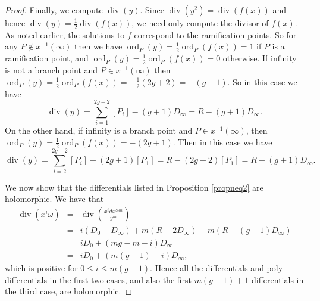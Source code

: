\documentclass[11pt]{article} %
\theoremstyle{plain}
\theoremstyle{remark}
\newcommand{\cL}{{\mathcal L}}
\DeclareMathOperator{\ord}{ord}
\DeclareMathOperator{\di}{div}
\begin{document}
\begin{proof}
Finally, we compute $\di (y)$.
Since $\di (y^2) = \di (f(x))$ and hence $\di(y) = \frac{1}{2}\di(f(x))$, we need only compute the divisor of $f(x)$.
As noted earlier, the solutions to $f$ correspond to the ramification points.
So for any $P\notin x^{-1}(\infty)$ then we have $\ord_P(y) =  \frac{1}{2}\ord_P(f(x)) = 1$ if $P$ is a ramification point, and $\ord_P(y) = \frac{1}{2}\ord_P(f(x)) = 0$ otherwise.
If infinity is not a branch point and $P\in x^{-1}(\infty)$ then $\ord_P(y)  = \frac{1}{2}\ord_P(f(x)) = - \frac{1}{2} (2g+2) = -(g+1)$.
So in this case we have
\[
 \di(y) = \sum_{i=1}^{2g+2} [P_i]- (g+1)D_\infty = R - (g+1)D_{\infty}.
 \]
On the other hand, if infinity is a branch point and $P\in x^{-1}(\infty)$, then $\ord_P(y)  = \frac{1}{2}\ord_P(f(x)) = - (2g+1)$.
Then in this case we have 
\[
 \di(y) = \sum_{i=2}^{2g+2} [P_i] - (2g+1)[P_1] = R - (2g+2)[P_1] = R-(g+1)D_\infty.
 \]
\begin{comment}
Firstly, since $y(p_i)= y(j(p_i)) = j^*(y)(p_i)= -y(p_i)$ for all $i$ we see that $y(p_i)=0$.
Therefore $\deg(y)_0 \geq \deg\left(\sum_{i = 1}^{2g +2} [p_i] \right) = 2g+2$.
But since $y\in \cL(D)$, we know that $\deg(y)_{\infty} \leq \deg((g+1)D) = 2g + 2$, and as $\deg(y) = \deg(y)_0 - \deg(y)_{\infty} = 0$ then $\deg(y)_0 = \deg(y)_{\infty} = 2g+2$.
So
\[
 (y)_0 = \sum_{i=1}^{2g+2} [p_i], \ (y)_{\infty} = (g+1)D_\infty.
\]
\end{comment}

We now show that the differentials listed in Proposition \ref{propneq2} are holomorphic.
We have that
\begin{eqnarray*}
 \di(x^i\omega) & = & \di \left( \frac{x^idx^{\otimes m}}{y^m} \right)\\ & = & i(D_0 -D_\infty) + m(R-2D_\infty) -m(R-(g+1)D_\infty) \\
 & = & iD_0 + (mg -m -i)D_\infty \\
 & = & iD_0 + (m(g-1) -i)D_\infty,
\end{eqnarray*}
which is positive for $0\leq i \leq m(g-1)$.
Hence all the differentials and poly-differentials in the first two cases, and also the first $m(g-1)+1$ differentials in the third case, are holomorphic.

\begin{comment}
If $m=g=2$ then we have that
\begin{eqnarray*}
 \di\left(\frac{x^idx^{\otimes 2}}{y^2}\right) & = & i(D_0-D_\infty) + 2(R-2D_\infty) - 2(R-(g+1)D_\infty) \\
 & = & iD_0+ ((2g-2)-i)D_\infty \\
 & = & iD_0 +(2-i)D_\infty,
\end{eqnarray*}
which is positive for $0\leq 2$.
By Lemma \ref{dim3} then $\dim_kH^0(X,\Omega_X^{\otimes 2})=3$, so again, we have three linearly independent elements, so they must form a basis.
\end{comment}



\end{proof}
\end{document}
